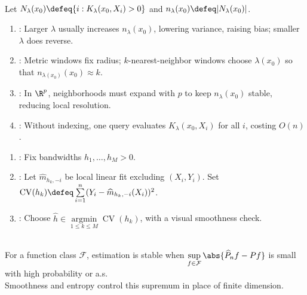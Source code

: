 \begin{remark} \label{rem:kernel-smoothing-practical-tradeoffs} \\
Let $N_\lambda(x_0)\defeq\{i:K_\lambda(x_0,X_i)>0\}$ and $n_\lambda(x_0)\defeq|N_\lambda(x_0)|$.
\begin{enumerate}[label=(\roman*)]
\setlength{\itemsep}{0pt}
\item {}: Larger $\lambda$ usually increases $n_\lambda(x_0)$, lowering variance, raising bias; smaller $\lambda$ does reverse.
\item {}: Metric windows fix radius; $k$-nearest-neighbor windows choose $\lambda(x_0)$ so that $n_{\lambda(x_0)}(x_0)\approx k$.
\item {}: In $\R^p$, neighborhoods must expand with $p$ to keep $n_\lambda(x_0)$ stable, reducing local resolution.
\item {}: Without indexing, one query evaluates $K_\lambda(x_0,X_i)$ for all $i$, costing $O(n)$.
\end{enumerate}
\end{remark}

\begin{method} \label{meth:local-linear-bandwidth-cross-validation} 
\begin{enumerate}[label=(\roman*)]
\setlength{\itemsep}{0pt}
\item {}: Fix bandwidths $h_1,\ldots,h_M>0$.
\item {}: Let $\widehat{m}_{h_k,-i}$ be local linear fit excluding $(X_i,Y_i)$. Set $\operatorname{CV}(h_k)\defeq\sum\limits_{i=1}^n(Y_i-\widehat{m}_{h_k,-i}(X_i))^2$.
\item {}: Choose $\widehat{h}\in\operatorname*{argmin}\limits_{1\leq k\leq M}\operatorname{CV}(h_k)$, with a visual smoothness check.
\end{enumerate}
\end{method}

\begin{remark} \label{rem:complexity-controls-nonparametric-estimation} \\
For a function class $\mathcal{F}$, estimation is stable when $\sup\limits_{f\in\mathcal{F}}\abs{\widehat{P}_nf-Pf}$ is small with high probability or a.s.\\
Smoothness and entropy control this supremum in place of finite dimension.
\end{remark}
